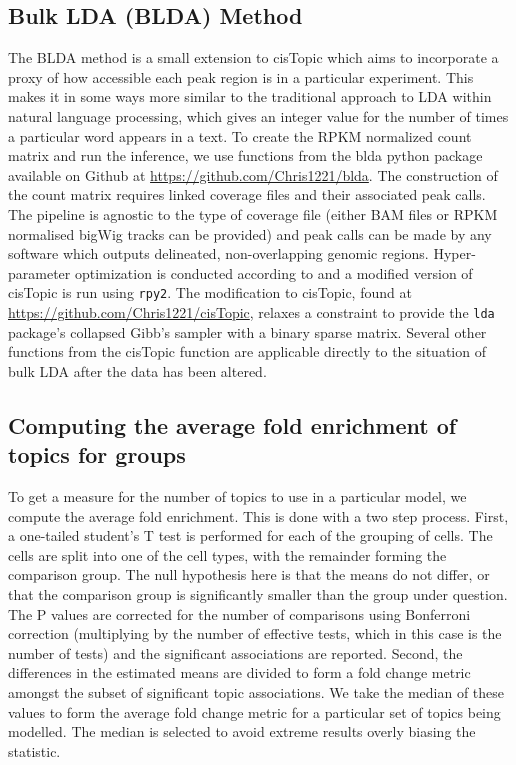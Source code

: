 \subsection{Bulk LDA (BLDA) Method} \label{ch4:method_blda}

The BLDA method is a small extension to cisTopic which aims to incorporate a proxy of how accessible each peak region is in a particular experiment. This makes it in some ways more similar to the traditional approach to LDA within natural language processing, which gives an integer value for the number of times a particular word appears in a text. To create the RPKM normalized count matrix and run the inference, we use functions from the blda python package available on Github at \url{https://github.com/Chris1221/blda}.  The construction of the count matrix requires linked coverage files and their associated peak calls. The pipeline is agnostic to the type of coverage file (either BAM files or RPKM normalised bigWig tracks can be provided) and peak calls can be made by any software which outputs delineated, non-overlapping genomic regions. Hyper-parameter optimization is conducted according to  and a modified version of cisTopic is run using {\tt rpy2}. The modification to cisTopic, found at \url{https://github.com/Chris1221/cisTopic}, relaxes a constraint to provide the {\tt lda} package's collapsed Gibb's sampler with a binary sparse matrix. Several other functions from the cisTopic function are applicable directly to the situation of bulk LDA after the data has been altered. 

\subsection{Computing the average fold enrichment of topics for groups} \label{methods:average_fc}

To get a measure for the number of topics to use in a particular model, we compute the average fold enrichment. This is done with a two step process. First, a one-tailed student's T test is performed for each of the grouping of cells. The cells are split into one of the cell types, with the remainder forming the comparison group. The null hypothesis here is that the means do not differ, or that the comparison group is significantly smaller than the group under question. The P values are corrected for the number of comparisons using Bonferroni correction (multiplying by the number of effective tests, which in this case is the number of tests) and the significant associations are reported. Second, the differences in the estimated means are divided to form a fold change metric amongst the subset of significant topic associations. We take the median of these values to form the average fold change metric for a particular set of topics being modelled. The median is selected to avoid extreme results overly biasing the statistic.

